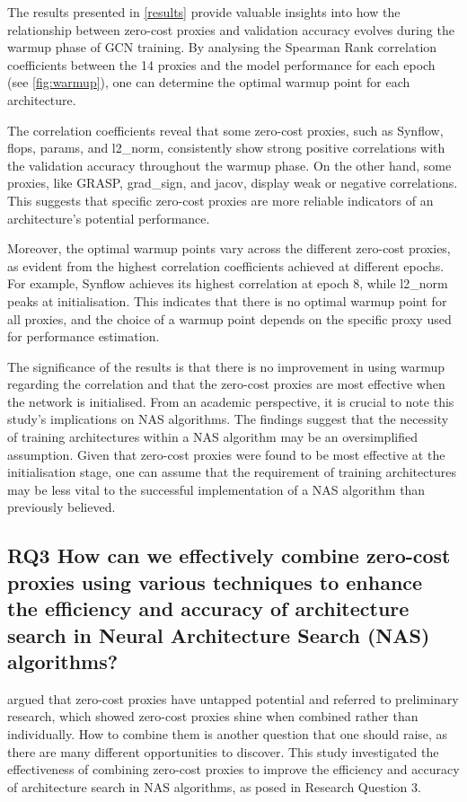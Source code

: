 The results presented in \cref{results} provide valuable insights into how the relationship between zero-cost proxies and validation accuracy evolves during the warmup phase of \gls{GCN} training. By analysing the Spearman Rank correlation coefficients between the 14 proxies and the model performance for each epoch (see \cref{fig:warmup}), one can determine the optimal warmup point for each architecture.

The correlation coefficients reveal that some zero-cost proxies, such as \gls{Synflow}, flops, params, and l2\_norm, consistently show strong positive correlations with the validation accuracy throughout the warmup phase. On the other hand, some proxies, like \gls{GRASP}, grad\_sign, and jacov, display weak or negative correlations. This suggests that specific zero-cost proxies are more reliable indicators of an architecture's potential performance.

Moreover, the optimal warmup points vary across the different zero-cost proxies, as evident from the highest correlation coefficients achieved at different epochs. For example, \gls{Synflow} achieves its highest correlation at epoch 8, while l2\_norm peaks at initialisation. This indicates that there is no optimal warmup point for all proxies, and the choice of a warmup point depends on the specific proxy used for performance estimation.

The significance of the results is that there is no improvement in using warmup regarding the correlation and that the zero-cost proxies are most effective when the network is initialised. From an academic perspective, it is crucial to note this study's implications on \gls{NAS} algorithms. The findings suggest that the necessity of training architectures within a \gls{NAS} algorithm may be an oversimplified assumption. Given that zero-cost proxies were found to be most effective at the initialisation stage, one can assume that the requirement of training architectures may be less vital to the successful implementation of a \gls{NAS} algorithm than previously believed.

\subsection{RQ3 How can we effectively combine zero-cost proxies using various techniques to enhance the efficiency and accuracy of architecture search in Neural Architecture Search (NAS) algorithms?}

\cite{colin2022adeeperlook} argued that zero-cost proxies have untapped potential and referred to preliminary research, which showed zero-cost proxies shine when combined rather than individually. How to combine them is another question that one should raise, as there are many different opportunities to discover. This study investigated the effectiveness of combining zero-cost proxies to improve the efficiency and accuracy of architecture search in \gls{NAS} algorithms, as posed in Research Question 3. 

